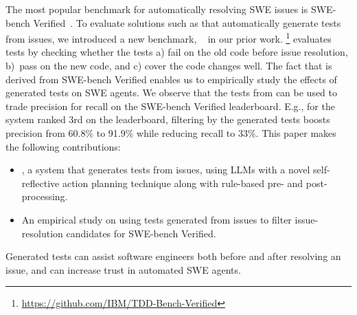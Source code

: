 The most popular benchmark for automatically resolving SWE
issues is SWE-bench Verified~\cite{chowdhury_et_al_2024}.
To evaluate solutions such as \solx that automatically generate tests
from issues, we introduced a new benchmark, \tdd~\cite{ahmed2024tdd} in our prior work.
\tdd\footnote{\url{https://github.com/IBM/TDD-Bench-Verified}} evaluates tests by checking whether the tests a) fail on the old
code before issue resolution, b)~pass on the new code, and
c) cover the code changes well.
The fact that \tdd is derived from SWE-bench Verified enables us to
empirically study the effects of generated tests on SWE agents.
We observe that the tests from \soly can be used to trade precision for
recall on the SWE-bench Verified leaderboard.
E.g., for the system ranked 3rd on the leaderboard, filtering by the
generated tests boosts precision from 60.8\% to 91.9\% while
reducing recall to 33\%.
This paper makes the following contributions:

\begin{itemize}[leftmargin=1em, topsep=0pt, itemsep=0pt, parsep=0pt]
  \item \solx, a system that generates tests from issues, using LLMs
    with a novel self-reflective action planning technique along with
    rule-based pre- and post-processing.
  \item An empirical study on using tests generated from issues to
    filter issue-resolution candidates for SWE-bench Verified.
\end{itemize}

Generated tests can assist software engineers both before and after
resolving an issue, and can increase trust in automated
SWE agents.
